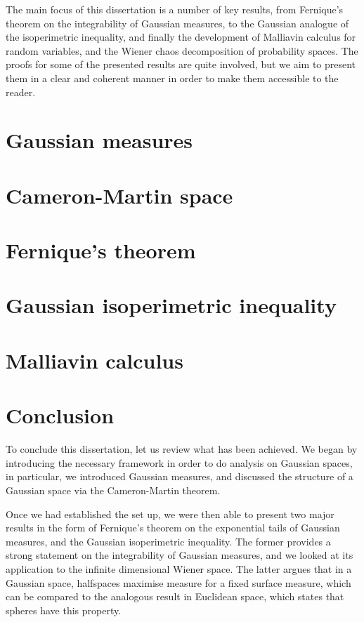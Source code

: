 \documentclass[12pt]{report}
\begin{document}
The main focus of this dissertation is a number of key results, from Fernique's theorem on the integrability of Gaussian measures, to the Gaussian analogue of the isoperimetric inequality, and finally the development of Malliavin calculus for random variables, and the Wiener chaos decomposition of probability spaces. The proofs for some of the presented results are quite involved, but we aim to present them in a clear and coherent manner in order to make them accessible to the reader.

\chapter{Gaussian measures}
\label{chp:Gaussian_measures}


\chapter{Cameron-Martin space}


\chapter{Fernique's theorem}


\chapter{Gaussian isoperimetric inequality}


\chapter{Malliavin calculus}


\chapter*{Conclusion}
To conclude this dissertation, let us review what has been achieved. We began by introducing the necessary framework in order to do analysis on Gaussian spaces, in particular, we introduced Gaussian measures, and discussed the structure of a Gaussian space via the Cameron-Martin theorem. 

Once we had established the set up, we were then able to present two major results in the form of Fernique's theorem on the exponential tails of Gaussian measures, and the Gaussian isoperimetric inequality. The former provides a strong statement on the integrability of Gaussian measures, and we looked at its application to the infinite dimensional Wiener space. The latter argues that in a Gaussian space, halfspaces maximise measure for a fixed surface measure, which can be compared to the analogous result in Euclidean space, which states that spheres have this property.
\end{document}

